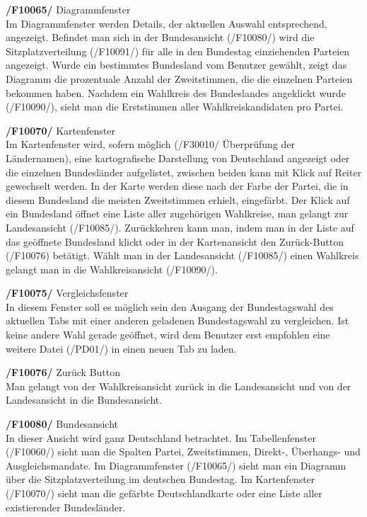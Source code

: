 \documentclass[10pt,a4paper]{article}
\begin{document}
\begin{description}
	\item \textbf{/F10065/} Diagrammfenster \hfill \\
	Im Diagrammfenster werden Details, der aktuellen Auswahl entsprechend, angezeigt. Befindet man sich in der Bundesansicht (/F10080/) wird die Sitzplatzverteilung (/F10091/) für alle in den Bundestag einziehenden Parteien angezeigt. Wurde ein bestimmtes Bundesland vom Benutzer gewählt, zeigt das Diagramm die prozentuale Anzahl der Zweitstimmen, die die einzelnen Parteien bekommen haben. Nachdem ein Wahlkreis des Bundeslandes angeklickt wurde (/F10090/), sieht man die Erststimmen aller Wahlkreiskandidaten pro Partei. \hfill \\
	\item \textbf{/F10070/} Kartenfenster \hfill \\
	Im Kartenfenster wird, sofern möglich (/F30010/ Überprüfung der Ländernamen), eine kartografische Darstellung von Deutschland angezeigt oder die einzelnen Bundesländer aufgelistet, zwischen beiden kann mit Klick auf Reiter gewechselt werden. In der Karte werden diese nach der Farbe der Partei, die in diesem Bundesland die meisten Zweitstimmen erhielt, eingefärbt. Der Klick auf ein Bundesland öffnet eine Liste aller zugehörigen Wahlkreise, man gelangt zur Landesansicht (/F10085/). Zurückkehren kann man, indem man in der Liste auf das geöffnete Bundesland klickt oder in der Kartenansicht den Zurück-Button (/F10076) betätigt. Wählt man in der Landesansicht (/F10085/) einen Wahlkreis gelangt man in die Wahlkreisansicht (/F10090/). \hfill \\
	\item \textbf{/F10075/} Vergleichsfenster \hfill \\
	In diesem Fenster soll es möglich sein den Ausgang der Bundestagswahl des aktuellen Tabs mit einer anderen geladenen Bundestagswahl zu vergleichen. Ist keine andere Wahl gerade geöffnet, wird dem Benutzer erst empfohlen eine weitere Datei (/PD01/) in einen neuen Tab zu laden. \hfill \\
	\item \textbf{/F10076/} Zurück Button\hfill \\
	Man gelangt von der Wahlkreisansicht zurück in die Landesansicht und von der Landesansicht in die Bundesansicht. \hfill \\
	\item \textbf{/F10080/} Bundesansicht \hfill \\
	In dieser Ansicht wird ganz Deutschland betrachtet. Im Tabellenfenster (/F10060/) sieht man die Spalten Partei, Zweitstimmen, Direkt-, Überhangs- und Ausgleichsmandate. Im Diagrammfenster (/F10065/) sieht man ein Diagramm über die Sitzplatzverteilung im deutschen Bundestag. Im Kartenfenster (/F10070/) sieht man die gefärbte Deutschlandkarte oder eine Liste aller existierender Bundesländer. \hfill \\

\end{description}
\end{document}
